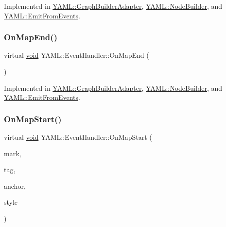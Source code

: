 Implemented in \mbox{\hyperlink{class_y_a_m_l_1_1_graph_builder_adapter_aae52d2e2c6d73fd4df9b7979cdee8de6}{Y\+A\+M\+L\+::\+Graph\+Builder\+Adapter}}, \mbox{\hyperlink{class_y_a_m_l_1_1_node_builder_a5c14e6ce94790880411dc26f60fc25c5}{Y\+A\+M\+L\+::\+Node\+Builder}}, and \mbox{\hyperlink{class_y_a_m_l_1_1_emit_from_events_a1099ab75b0df15b3d5b42d07a935a6c6}{Y\+A\+M\+L\+::\+Emit\+From\+Events}}.

\mbox{\label{class_y_a_m_l_1_1_event_handler_a6b8821803de4ecca96a05c3296fb565f}} 
\subsubsection{\texorpdfstring{OnMapEnd()}{OnMapEnd()}}
{\footnotesize\ttfamily virtual \mbox{\hyperlink{glad_8h_a950fc91edb4504f62f1c577bf4727c29}{void}} Y\+A\+M\+L\+::\+Event\+Handler\+::\+On\+Map\+End (\begin{DoxyParamCaption}{ }\end{DoxyParamCaption})\hspace{0.3cm}{\ttfamily [pure virtual]}}



Implemented in \mbox{\hyperlink{class_y_a_m_l_1_1_graph_builder_adapter_ad117ea7f74cdef8b2bb2243e5e399f49}{Y\+A\+M\+L\+::\+Graph\+Builder\+Adapter}}, \mbox{\hyperlink{class_y_a_m_l_1_1_node_builder_af6eee8daf61700c793e4e03acc49caf9}{Y\+A\+M\+L\+::\+Node\+Builder}}, and \mbox{\hyperlink{class_y_a_m_l_1_1_emit_from_events_ae2691daa2ec354c998d1ed25c648fd06}{Y\+A\+M\+L\+::\+Emit\+From\+Events}}.

\mbox{\label{class_y_a_m_l_1_1_event_handler_a57fc2477cb1f4fd3a650e41180e6f9b6}} 
\subsubsection{\texorpdfstring{OnMapStart()}{OnMapStart()}}
{\footnotesize\ttfamily virtual \mbox{\hyperlink{glad_8h_a950fc91edb4504f62f1c577bf4727c29}{void}} Y\+A\+M\+L\+::\+Event\+Handler\+::\+On\+Map\+Start (\begin{DoxyParamCaption}\item[{const \mbox{\hyperlink{struct_y_a_m_l_1_1_mark}{Mark}} \&}]{mark,  }\item[{const \mbox{\hyperlink{glad_8h_ac83513893df92266f79a515488701770}{std\+::string}} \&}]{tag,  }\item[{\mbox{\hyperlink{namespace_y_a_m_l_abeff1798814ae3402fc5665fdcad1de6}{anchor\+\_\+t}}}]{anchor,  }\item[{\mbox{\hyperlink{struct_y_a_m_l_1_1_emitter_style_ae86640662c85ce6062a37f9636b6959f}{Emitter\+Style\+::value}}}]{style }\end{DoxyParamCaption})\hspace{0.3cm}{\ttfamily [pure virtual]}}



